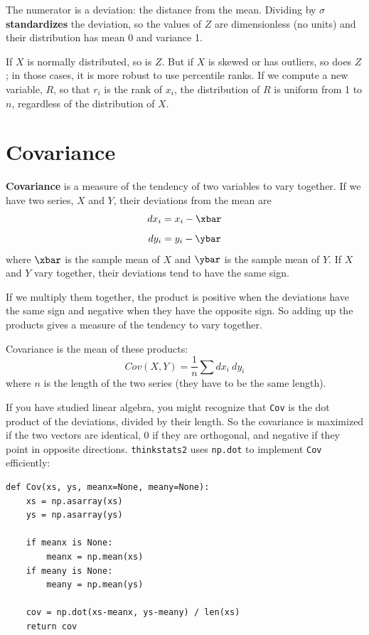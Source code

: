 The numerator is a deviation: the distance from the mean.  Dividing by
$\sigma$ {\bf standardizes} the deviation, so the values of $Z$ are
dimensionless (no units) and their distribution has mean 0 and
variance 1.

If $X$ is normally distributed, so is $Z$.  But if $X$ is skewed or has
outliers, so does $Z$; in those cases, it is more robust to use
percentile ranks.  If we compute a new variable, $R$, so that $r_i$ is
the rank of $x_i$, the distribution of $R$ is uniform
from 1 to $n$, regardless of the distribution of $X$.
 


\section{Covariance}

{\bf Covariance} is a measure of the tendency of two variables
to vary together.  If we have two series, $X$ and $Y$, their
deviations from the mean are
%
\[ dx_i = x_i - \xbar \]
\[ dy_i = y_i - \ybar \]
%
where $\xbar$ is the sample mean of $X$ and $\ybar$ is the sample mean
of $Y$.  If $X$ and $Y$ vary together, their deviations tend to have
the same sign.

If we multiply them together, the product is positive when the
deviations have the same sign and negative when they have the opposite
sign.  So adding up the products gives a measure of the tendency to
vary together.

Covariance is the mean of these products:
%
\[ Cov(X,Y) = \frac{1}{n} \sum dx_i~dy_i \]
%
where $n$ is the length of the two series (they have to be the same
length).

If you have studied linear algebra, you might recognize that
{\tt Cov} is the dot product of the deviations, divided
by their length.  So the covariance is maximized if the two vectors
are identical, 0 if they are orthogonal, and negative if they
point in opposite directions.  {\tt thinkstats2} uses {\tt np.dot} to
implement {\tt Cov} efficiently:

\begin{verbatim}
def Cov(xs, ys, meanx=None, meany=None):
    xs = np.asarray(xs)
    ys = np.asarray(ys)

    if meanx is None:
        meanx = np.mean(xs)
    if meany is None:
        meany = np.mean(ys)

    cov = np.dot(xs-meanx, ys-meany) / len(xs)
    return cov
\end{verbatim}

